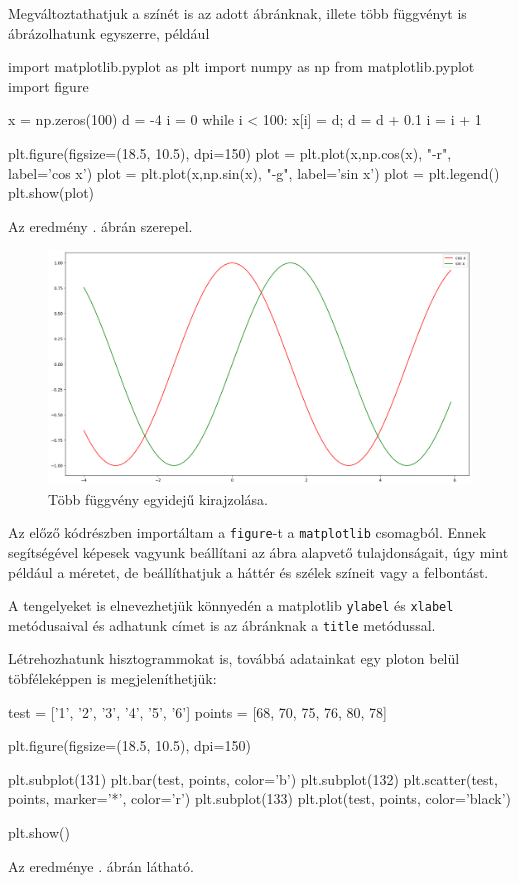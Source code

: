     Megváltoztathatjuk a színét is az adott ábránknak, illete több függvényt
is ábrázolhatunk egyszerre, például
\begin{python}
import matplotlib.pyplot as plt
import numpy as np
from matplotlib.pyplot import figure

x = np.zeros(100)
d = -4
i = 0
while i < 100:
    x[i] = d;
    d = d + 0.1
    i = i + 1
    
plt.figure(figsize=(18.5, 10.5), dpi=150)
plot = plt.plot(x,np.cos(x), "-r", label='cos x')
plot = plt.plot(x,np.sin(x), "-g", label='sin x')
plot = plt.legend()
plt.show(plot)
\end{python}
Az eredmény . ábrán szerepel.

\begin{figure}[h!]
\centering
\includegraphics[width=\textwidth]{img/sin-plot.png}
\caption{Több függvény egyidejű kirajzolása.}
\label{fig:sin-plot}
\end{figure}

    Az előző kódrészben importáltam a \texttt{figure}-t a \texttt{matplotlib}
csomagból. Ennek segítségével képesek vagyunk beállítani az ábra
alapvető tulajdonságait, úgy mint például a méretet, de beállíthatjuk a háttér és
szélek színeit vagy a felbontást.

A tengelyeket is elnevezhetjük könnyedén a matplotlib \texttt{ylabel} és
\texttt{xlabel} metódusaival és adhatunk címet is az ábránknak a
\texttt{title} metódussal.

Létrehozhatunk hisztogrammokat is, továbbá adatainkat egy ploton belül töbféleképpen is megjeleníthetjük:
\begin{python}
test = ['1', '2', '3', '4', '5', '6']
points = [68, 70, 75, 76, 80, 78]

plt.figure(figsize=(18.5, 10.5), dpi=150)

plt.subplot(131)
plt.bar(test, points, color='b')
plt.subplot(132)
plt.scatter(test, points, marker='*', color='r')
plt.subplot(133)
plt.plot(test, points, color='black')

plt.show()
\end{python}
Az eredménye . ábrán látható.

